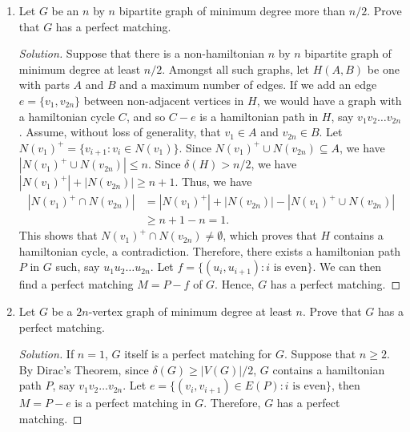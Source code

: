 \documentclass{article}
\newenvironment{problem}[2][Problem]{\begin{trivlist}
\item[\hskip \labelsep {\bfseries #1}\hskip \labelsep {\bfseries #2.}]}{\end{trivlist}}
\begin{document}
\begin{problem}{3.8.8}
    
\end{problem}
\begin{enumerate}[label=(\alph*)]
    \item Let $G$ be an $n$ by $n$ bipartite graph of minimum degree more than $n/2$. Prove that $G$ has a perfect matching.
    \begin{proof}[Solution]
        Suppose that there is a non-hamiltonian $n$ by $n$ bipartite graph of minimum degree at least $n /2$. Amongst all such graphs, let $H(A, B)$ be one with parts $A$ and $B$ and a maximum number of edges. If we add an edge $e = \{v_1, v_{2n}\}$ between non-adjacent vertices in $H$, we would have a graph with a hamiltonian cycle $C$, and so $C - e$ is a hamiltonian path in $H$, say $v_1v_2 \dots v_{2n}$. Assume, without loss of generality, that $v_1 \in A$ and $v_{2n} \in B$. Let $N(v_1)^+ = \{v_{i+1} : v_i \in N(v_1)\}$. Since $N(v_1)^+ \cup N(v_{2n}) \subseteq A$, we have $|N(v_1)^+ \cup N(v_{2n})| \leq n$. Since $\delta(H) > n/2$, we have $|N(v_1)^+| + |N(v_{2n})| \geq n + 1$. Thus, we have
        \begin{align}
            |N(v_1)^+ \cap N(v_{2n})| 
            &= |N(v_1)^+| + |N(v_{2n})| - |N(v_1)^+ \cup N(v_{2n})| \\
            &\geq n + 1 - n = 1.
        \end{align}
        This shows that $N(v_1)^+ \cap N(v_{2n}) \neq \emptyset$, which proves that $H$ contains a hamiltonian cycle, a contradiction. Therefore, there exists a hamiltonian path $P$ in $G$ such, say $u_1 u_2 \dots u_{2n}$. Let $f = \{(u_i, u_{i+1}) : i \text{ is even}\}$. We can then find a perfect matching $M = P - f$ of $G$. Hence, $G$ has a perfect matching.
    \end{proof}
    
    \item Let $G$ be a $2n$-vertex graph of minimum degree at least $n$. Prove that $G$ has a perfect matching.

    \begin{proof}[Solution]
        If $n = 1$, $G$ itself is a perfect matching for $G$. Suppose that $n \geq 2$. By Dirac's Theorem, since $\delta(G) \geq |V(G)|/2$, $G$ contains a hamiltonian path $P$, say $v_1v_2 \dots v_{2n}$. Let $e = \{(v_i, v_{i+1}) \in E(P) : i \text{ is even}\}$, then $M = P - e$ is a perfect matching in $G$. Therefore, $G$ has a perfect matching.
    \end{proof}
\end{enumerate}
\end{document}
